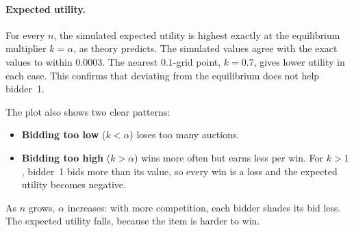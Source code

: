 \documentclass[11pt,a4paper]{article}
\begin{document}
\begin{table}[H]
\centering
\caption{Part 2: best multiplier for bidder~1 ($v=0.5$, 200,000 auctions per $n$).}
\label{tab:part2}
\small
{}
\end{table}

\paragraph{Expected utility.} For every $n$, the simulated expected utility is highest exactly at the equilibrium multiplier $k=\alpha$, as theory predicts. The simulated values agree with the exact values to within $0.0003$. The nearest $0.1$-grid point, $k=0.7$, gives lower utility in each case. This confirms that deviating from the equilibrium does not help bidder~1.

The plot also shows two clear patterns:
\begin{itemize}
  \item \textbf{Bidding too low} ($k<\alpha$) loses too many auctions.
  \item \textbf{Bidding too high} ($k>\alpha$) wins more often but earns less per win. For $k>1$, bidder~1 bids more than its value, so every win is a loss and the expected utility becomes negative.
\end{itemize}
As $n$ grows, $\alpha$ increases: with more competition, each bidder shades its bid less. The expected utility falls, because the item is harder to win.

\begin{table}[H]
\centering
\caption{Part 2: ``could have paid less and still won'' at the equilibrium multiplier $k=\alpha$ (bid increment $0.01$).}
\label{tab:part2paidless}
\small
{}
\end{table}
\end{document}
